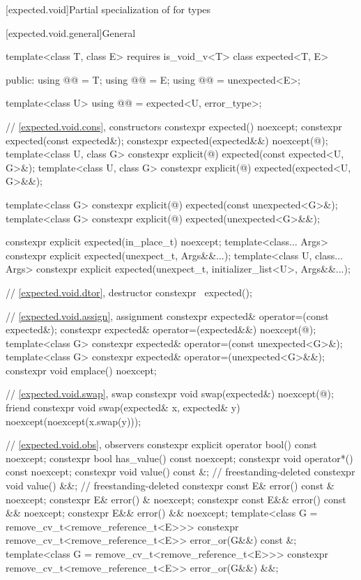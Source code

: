 [expected.void]{Partial specialization of  for  types}

[expected.void.general]{General}

\begin{codeblock}
template<class T, class E> requires is_void_v<T>
class expected<T, E> {
public:
  using @@ = T;
  using @@ = E;
  using @@ = unexpected<E>;

  template<class U>
  using @@ = expected<U, error_type>;

  // \ref{expected.void.cons}, constructors
  constexpr expected() noexcept;
  constexpr expected(const expected&);
  constexpr expected(expected&&) noexcept(@\seebelow@);
  template<class U, class G>
    constexpr explicit(@\seebelow@) expected(const expected<U, G>&);
  template<class U, class G>
    constexpr explicit(@\seebelow@) expected(expected<U, G>&&);

  template<class G>
    constexpr explicit(@\seebelow@) expected(const unexpected<G>&);
  template<class G>
    constexpr explicit(@\seebelow@) expected(unexpected<G>&&);

  constexpr explicit expected(in_place_t) noexcept;
  template<class... Args>
    constexpr explicit expected(unexpect_t, Args&&...);
  template<class U, class... Args>
    constexpr explicit expected(unexpect_t, initializer_list<U>, Args&&...);

  // \ref{expected.void.dtor}, destructor
  constexpr ~expected();

  // \ref{expected.void.assign}, assignment
  constexpr expected& operator=(const expected&);
  constexpr expected& operator=(expected&&) noexcept(@\seebelow@);
  template<class G>
    constexpr expected& operator=(const unexpected<G>&);
  template<class G>
    constexpr expected& operator=(unexpected<G>&&);
  constexpr void emplace() noexcept;

  // \ref{expected.void.swap}, swap
  constexpr void swap(expected&) noexcept(@\seebelow@);
  friend constexpr void swap(expected& x, expected& y) noexcept(noexcept(x.swap(y)));

  // \ref{expected.void.obs}, observers
  constexpr explicit operator bool() const noexcept;
  constexpr bool has_value() const noexcept;
  constexpr void operator*() const noexcept;
  constexpr void value() const &;                                           // freestanding-deleted
  constexpr void value() &&;                                                // freestanding-deleted
  constexpr const E& error() const & noexcept;
  constexpr E& error() & noexcept;
  constexpr const E&& error() const && noexcept;
  constexpr E&& error() && noexcept;
  template<class G = remove_cv_t<remove_reference_t<E>>>
    constexpr remove_cv_t<remove_reference_t<E>> error_or(G&&) const &;
  template<class G = remove_cv_t<remove_reference_t<E>>>
    constexpr remove_cv_t<remove_reference_t<E>> error_or(G&&) &&;

}
\end{codeblock}
